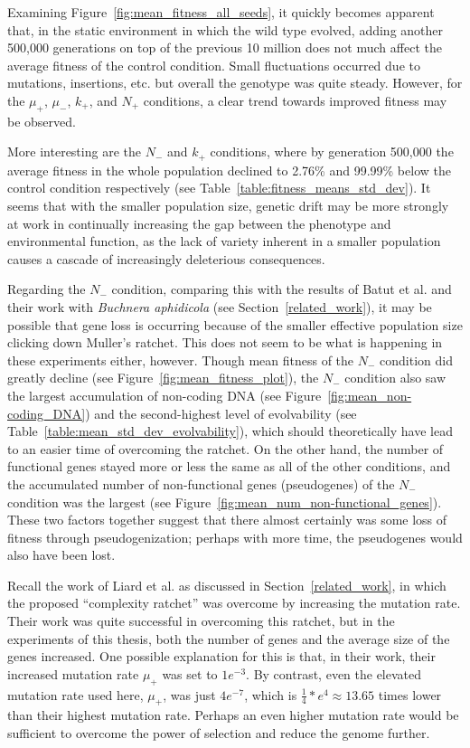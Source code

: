Examining Figure~\ref{fig:mean_fitness_all_seeds}, it quickly becomes apparent that, in the static environment in which the wild type evolved, adding another 500,000 generations on top of the previous 10 million does not much affect the average fitness of the control condition. Small fluctuations occurred due to mutations, insertions, etc. but overall the genotype was quite steady. However, for the $\mu_+$, $\mu_-$, $k_+$, and $N_+$ conditions, a clear trend towards improved fitness may be observed.

More interesting are the $N_-$ and $k_+$ conditions, where by generation 500,000 the average fitness in the whole population declined to 2.76\% and 99.99\% below the control condition respectively (see Table~\ref{table:fitness_means_std_dev}). It seems that with the smaller population size, genetic drift may be more strongly at work in continually increasing the gap between the phenotype and environmental function, as the lack of variety inherent in a smaller population causes a cascade of increasingly deleterious consequences.
 
Regarding the $N_-$ condition, comparing this with the results of Batut et al. and their work with \textit{Buchnera aphidicola} (see Section~\ref{related_work}), it may be possible that gene loss is occurring because of the smaller effective population size clicking down Muller's ratchet. This does not seem to be what is happening in these experiments either, however. Though mean fitness of the $N_-$ condition did greatly decline (see Figure~\ref{fig:mean_fitness_plot}), the $N_-$ condition also saw the largest accumulation of non-coding DNA (see Figure~\ref{fig:mean_non-coding_DNA}) and the second-highest level of evolvability (see Table~\ref{table:mean_std_dev_evolvability}), which should theoretically have lead to an easier time of overcoming the ratchet. On the other hand, the number of functional genes stayed more or less the same as all of the other conditions, and the accumulated number of non-functional genes (pseudogenes) of the $N_-$ condition was the largest (see Figure~\ref{fig:mean_num_non-functional_genes}). These two factors together suggest that there almost certainly was some loss of fitness through pseudogenization; perhaps with more time, the pseudogenes would also have been lost.

Recall the work of Liard et al.\cite{Liard.2018} as discussed in Section~\ref{related_work}, in which the proposed ``complexity ratchet'' was overcome by increasing the mutation rate. Their work was quite successful in overcoming this ratchet, but in the experiments of this thesis, both the number of genes and the average size of the genes increased. One possible explanation for this is that, in their work, their increased mutation rate $\mu_+$ was set to $1e^{-3}$.  By contrast, even the elevated mutation rate used here, $\mu_+$, was just $4e^{-7}$, which is $\frac{1}{4}*e^4 \approx 13.65$ times lower than their highest mutation rate. Perhaps an even higher mutation rate would be sufficient to overcome the power of selection and reduce the genome further. 
